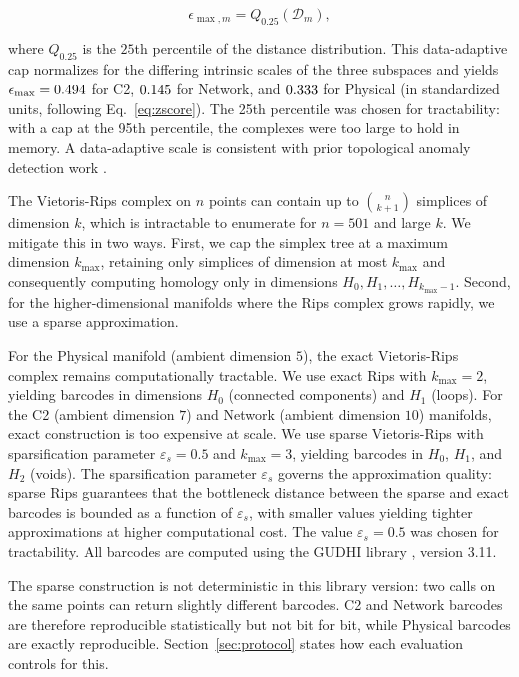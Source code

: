\documentclass[conf]{new-aiaa}
\begin{document}
\begin{equation}
\epsilon_{\max,m} = Q_{0.25}(\mathcal{D}_m),
\label{eq:filtration_cap}
\end{equation}

where $Q_{0.25}$ is the $25$th percentile of the distance distribution. This data-adaptive cap normalizes for the differing intrinsic scales of the three subspaces and yields $\epsilon_{\max} = 0.494{}$ for C2, $0.145{}$ for Network, and $0.333{}$ for Physical (in standardized units, following Eq.~\eqref{eq:zscore}). The 25th percentile was chosen for tractability: with a cap at the 95th percentile, the complexes were too large to hold in memory. A data-adaptive scale is consistent with prior topological anomaly detection work \cite{Bruillard}.

The Vietoris-Rips complex on $n$ points can contain up to $\binom{n}{k+1}$ simplices of dimension $k$, which is intractable to enumerate for $n = 501$ and large $k$. We mitigate this in two ways. First, we cap the simplex tree \cite{BoissonnatMaria} at a maximum dimension $k_{\max}$, retaining only simplices of dimension at most $k_{\max}$ and consequently computing homology only in dimensions $H_0, H_1, \ldots, H_{k_{\max}-1}$. Second, for the higher-dimensional manifolds where the Rips complex grows rapidly, we use a sparse approximation.

For the Physical manifold (ambient dimension $5$), the exact Vietoris-Rips complex remains computationally tractable. We use exact Rips with $k_{\max} = 2$, yielding barcodes in dimensions $H_0$ (connected components) and $H_1$ (loops). For the C2 (ambient dimension $7$) and Network (ambient dimension $10$) manifolds, exact construction is too expensive at scale. We use sparse Vietoris-Rips \cite{Cavanna} with sparsification parameter $\varepsilon_s = 0.5$ and $k_{\max} = 3$, yielding barcodes in $H_0$, $H_1$, and $H_2$ (voids). The sparsification parameter $\varepsilon_s$ governs the approximation quality: sparse Rips guarantees that the bottleneck distance between the sparse and exact barcodes is bounded as a function of $\varepsilon_s$, with smaller values yielding tighter approximations at higher computational cost. The value $\varepsilon_s = 0.5$ was chosen for tractability. All barcodes are computed using the GUDHI library \cite{Maria}, version 3.11.

The sparse construction is not deterministic in this library version: two calls on the same points can return slightly different barcodes. C2 and Network barcodes are therefore reproducible statistically but not bit for bit, while Physical barcodes are exactly reproducible. Section~\ref{sec:protocol} states how each evaluation controls for this.
\end{document}

